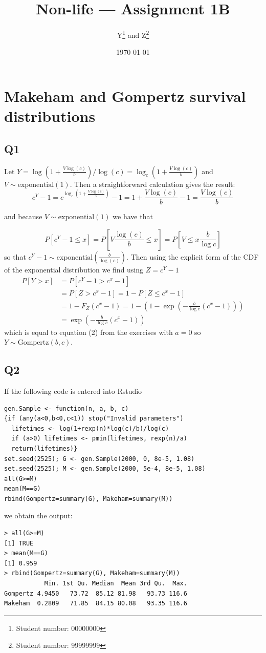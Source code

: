 \documentclass[11pt]{article}
\title{Non-life --- Assignment 1B}  %
\author{
  Y\footnote{Student number: 00000000}
  \quad and \quad
  Z\footnote{Student number: 99999999}
}
\date{\today}
\begin{document}
\maketitle

\section*{Makeham and Gompertz survival distributions}

\subsection*{Q1}

Let $Y = \log(1+\frac{V \log(c)}{b}) / \log(c) = \log_c(1+\frac{V \log(c)}{b})$ and $V \sim \text{exponential}(1)$. Then a straightforward calculation gives the result:
\begin{equation}
c^Y - 1 = c^{ \log_c(1+\frac{V \log(c)}{b})} - 1 = 1+\frac{V\log(c)}{b} - 1 = \frac{V \log(c)}{b}
\end{equation}

and because $V \sim \text{exponential}(1)$ we have that

\begin{equation}
P[c^Y - 1 \le x ] = P[V \frac{\log(c)}{b} \le x ] = P[V \le x \frac{b}{\log{c}}] 
\end{equation}
so that $c^Y - 1 \sim \text{exponential}( \frac{b}{\log(c)})$. Then using the explicit form of the CDF of the exponential distribution we find using $Z = c^Y - 1 $
\begin{equation}
\begin{split}
P[Y > x] & = P[c^Y - 1 > c^x - 1] \\ 
		 & = P[Z > c^x - 1] = 1- P[Z \le c^x - 1]  \\
		 & = 1 - F_Z(c^x - 1) = 1 - (1-\exp(-\frac{b}{\log c} (c^x - 1))) \\
	     & = \exp(-\frac{b}{\log c} (c^x - 1))
\end{split}
\end{equation}
which is equal to equation (2) from the exercises with $a = 0$ so $ Y \sim \text{Gompertz}(b,c)$.

\subsection*{Q2}
If the following code is entered into Rstudio
\begin{verbatim}
gen.Sample <- function(n, a, b, c)
{if (any(a<0,b<0,c<1)) stop("Invalid parameters")
  lifetimes <- log(1+rexp(n)*log(c)/b)/log(c)
  if (a>0) lifetimes <- pmin(lifetimes, rexp(n)/a)
  return(lifetimes)}
set.seed(2525); G <- gen.Sample(2000, 0, 8e-5, 1.08)
set.seed(2525); M <- gen.Sample(2000, 5e-4, 8e-5, 1.08)
all(G>=M) 
mean(M==G) 
rbind(Gompertz=summary(G), Makeham=summary(M))
\end{verbatim}
we obtain the output:
\begin{verbatim}
> all(G>=M) 
[1] TRUE
> mean(M==G) 
[1] 0.959
> rbind(Gompertz=summary(G), Makeham=summary(M))
           Min. 1st Qu. Median  Mean 3rd Qu.  Max.
Gompertz 4.9450   73.72  85.12 81.98   93.73 116.6
Makeham  0.2809   71.85  84.15 80.08   93.35 116.6
\end{verbatim}
\end{document}
